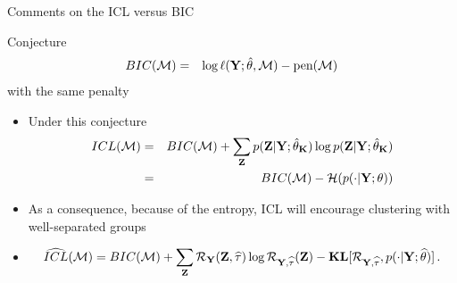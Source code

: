 \documentclass[compress,10pt]{beamer}
\begin{document}
 
 \begin{frame}{Comments on the   ICL versus BIC}
\begin{block}{Conjecture}
\begin{eqnarray*}
 BIC(\mathcal{M})  &=&  \log \ell(\mathbf{Y}; \hat{\theta}, \mathcal{M}) - \mbox{pen}(\mathcal{M})
\end{eqnarray*}
with the same penalty
 \end{block}

\begin{itemize}
\item Under this conjecture
\begin{eqnarray*}
 ICL(\mathcal{M})  &= & BIC(\mathcal{M})  +   \sum_{\mathbf{Z}} p(\mathbf{Z} | \mathbf{Y};\hat \theta_{\mathbf{K}}) \log p(\mathbf{Z} | \mathbf{Y}; \hat \theta_{\mathbf{K}})\\
 &=& BIC(\mathcal{M})  -   \mathcal{H}( p(\cdot | \mathbf{Y}; \theta)) 
\end{eqnarray*}
\item As a consequence, because of the entropy,  ICL  will encourage clustering with well-separated groups 
\item 
$$ 
 \widehat{ICL}(\mathcal{M})  =BIC(\mathcal{M})  +   \sum_{\mathbf{Z}} \mathcal{R}_{\mathbf{Y}}(\mathbf{Z},\widehat{\mathbf{\tau}})  \log \mathcal{R}_{\mathbf{Y},\widehat{\mathbf{\tau}}}({\mathbf{Z}}) -  \mathbf{KL}[\mathcal{R}_{\mathbf{Y},\widehat{\mathbf{\tau}}}, p(\cdot | \mathbf{Y};\widehat{\theta})]\,. 
$$

\end{itemize}

 
 \end{frame}
\end{document}
